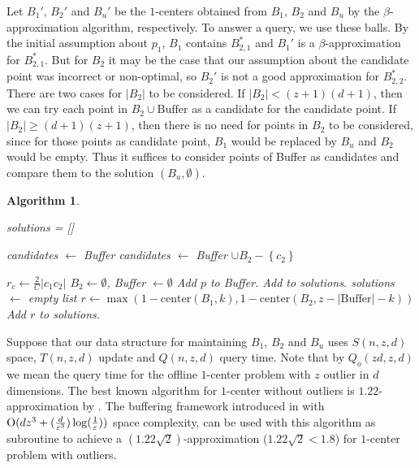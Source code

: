 \documentclass[envcountsame]{cls/cccg15}
\newtheorem{algorithm}{Algorithm}
\newcommand{\cO}{\ensuremath{{\rm O}}}
\newcommand{\set}[1]{\left\{ #1 \right\}}
\newcommand{\card}[1]{\left|{#1}\right|}
\newcommand{\gee}{\geqslant}
\renewcommand{\geq}{\gee}
\renewcommand{\ge}{\gee}
\newcommand{\eps}{\varepsilon}
\begin{document}
Let $B_1'$, $B_2'$ and $B_u'$ be the $1$-centers obtained from $B_1$, $B_2$ and $B_u$ by the $\beta$-approximation algorithm, respectively. To answer a query, we use these balls. By the initial assumption about $p_1$, $B_1$ contains $B_{2,1}^*$ and $B_1'$ is a $\beta$-approximation for $B_{2,1}^*$. But for $B_2$ it may be the case that our assumption about the candidate point was incorrect or non-optimal, so $B_2'$ is not a good approximation for $B_{2,2}^*$. There are two cases for $\card{B_2}$ to be considered. If $\card{B_2} < (z+1)(d+1)$, then we can try each point in $B_2 \cup \mbox{Buffer}$ as a candidate for the candidate point. If $\card{B_2} \ge (d+1)(z+1)$, then there is no need for points in $B_2$ to be considered, since for those points as candidate point, $B_1$ would be replaced by $B_u$ and $B_2$ would be empty. Thus it suffices to consider points of Buffer as candidates and compare them to the solution $(B_u, \emptyset)$.
{
\algrenewcommand\algorithmicindent{0.8em}%
\begin{algorithm}
\label{alg:query}
\leavevmode
\begin{algorithmic}
	\State solutions = []
	
	\If {$\card{B_2} \geq (d+1)(z+1)$}
		\State candidates $\gets$ Buffer
	\Else
		\State candidates $\gets$ Buffer $\cup B_2 - \set{c_2}$
	\EndIf

		\State $r_c \gets \frac{2}{C} \card{c_1 c_2}$
		\State $B_2 \gets \emptyset$, Buffer $\gets \emptyset$ 
				\State Add $p$ to Buffer.
			\EndIf
		\EndFor
		\State Add  to solutions.
	\EndFor
	\State \Return {}
\EndFunction
\Statex
{}
	\State solutions $\gets$ empty list
	\For{$k \gets 0, \dots,(z - \card{\mbox{Buffer}})$}
		\State $r \gets \max(1-\mbox{center}(B_1, k), 1-\mbox{center}(B_2, z - \card{\mbox{Buffer}} - k))$
		\State Add $r$ to solutions.
	\EndFor
	\State \Return {}
\EndFunction
\end{algorithmic}
\end{algorithm}
}

Suppose that our data structure for maintaining $B_1$, $B_2$ and $B_u$ uses $S(n,z,d)$ space, $T(n,z,d)$ update and $Q(n,z,d)$ query time. Note that by $Q_{o}(zd,z,d)$ we mean the query time for the offline $1$-center problem with $z$ outlier in $d$ dimensions. The best known algorithm for $1$-center without outliers is $1.22$-approximation by \cite{chan2014streaming, agarwal2010streaming}. The buffering framework introduced in \cite{zarrabi2009streaming} with $\cO(dz^3 + (\frac{d}{\eps^3})\log(\frac{1}{\eps}))$ space complexity, can be used with this algorithm as subroutine to achieve a $(1.22\sqrt{2})$-approximation ($1.22\sqrt{2} < 1.8$) for $1$-center problem with outliers.
\end{document}
